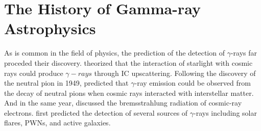 
\section{The History of Gamma-ray Astrophysics}










As is common in the field of physics, the prediction of
the detection of $\gamma$-rays far proceded their discovery.
\cite{cosmic_rays_feenberg_1948} theorized that the interaction
of starlight with cosmic rays could produce $\gamma-rays$ through
\ac{IC} upscattering.  Following the discovery of the neutral
pion in 1949, \cite{propagation_cosmic_radiation_hayakawa_1952}
predicted that $\gamma$-ray emission could be observed from the
decay of neutral pions when cosmic rays interacted with interstellar
matter.  And in the same year, \cite{cosmic_ray_hutchinson_1952}
discussed the bremsstrahlung radiation of cosmic-ray electrons.
\cite{gamma_ray_astronomy_morrison_1958} first predicted the detection
of several sources of $\gamma$-rays including solar flares, \acp{PWN},
and active galaxies.

    
